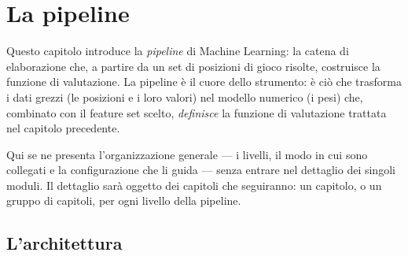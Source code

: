 %
%
%
%
%
%
%
%

%

\chapter{La pipeline}

Questo capitolo introduce la \emph{pipeline} di Machine Learning: la catena di
elaborazione che, a partire da un set di posizioni di gioco risolte, costruisce
la funzione di valutazione. La pipeline è il cuore dello strumento: è ciò
che trasforma i dati grezzi (le posizioni e i loro valori) nel modello numerico
(i pesi) che, combinato con il feature set scelto, \emph{definisce} la funzione
di valutazione trattata nel capitolo precedente.

Qui se ne presenta l'organizzazione generale — i livelli, il modo in cui sono
collegati e la configurazione che li guida — senza entrare nel dettaglio dei
singoli moduli. Il dettaglio sarà oggetto dei capitoli che seguiranno: un
capitolo, o un gruppo di capitoli, per ogni livello della pipeline.

\section{L'architettura}

